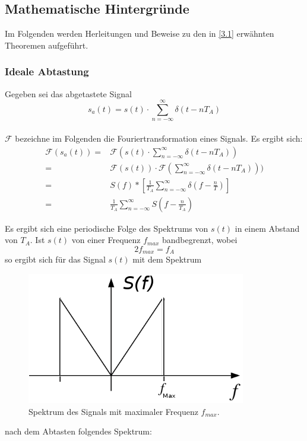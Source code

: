 \subsection{Mathematische Hintergründe}\label{3.2}
Im Folgenden werden Herleitungen und Beweise zu den in \ref{3.1} erwähnten Theoremen aufgeführt.

\subsubsection{Ideale Abtastung}
Gegeben sei das abgetastete Signal\\
$$s_a(t) = s(t) \cdot \sum_{n=-\infty}^{\infty} \delta(t - nT_A)$$\\
$\mathcal{F}$ bezeichne im Folgenden die Fouriertransformation eines Signals. Es ergibt sich:\\
\begin{equation}
\begin{aligned}
\mathcal{F}(s_a(t)) = &  \mathcal{F}(s(t) \cdot \sum\limits_{n=-\infty}^{\infty} \delta(t - nT_A)) \\
= & \mathcal{F}(s(t)) \cdot \mathcal{F}(\sum\limits_{n=-\infty}^{\infty} \delta(t - nT_A))) \\
= & S(f) * \left[ \frac{1}{T_A} \sum_{n = -\infty} ^ {\infty} \delta \left( f - \frac{n}{T} \right) \right] \\
= & \frac{1}{T_A} \sum_{n = -\infty} ^ {\infty} S\left( f - \frac{n}{T_A} \right)
\end{aligned}
\end{equation}



Es ergibt sich eine periodische Folge des Spektrums von $s(t)$ in einem Abstand von $T_A$. Ist $s(t)$ von einer Frequenz $f_{max}$ bandbegrenzt, wobei $$2f_{max} = f_A $$ 
so ergibt sich für das Signal $s(t)$ mit dem Spektrum

\begin{figure}[h!]
\centering
\includegraphics[scale=0.4]{images/fmax.png}
\caption{Spektrum des Signals mit maximaler Frequenz $f_{max}$.}
\label{fmax}
\end{figure}
\newpage
nach dem Abtasten folgendes Spektrum:

